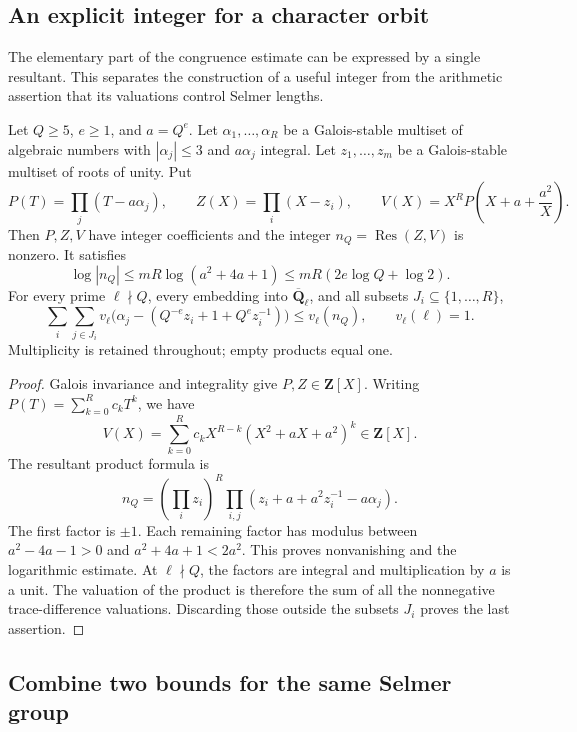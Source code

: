 \subsection{An explicit integer for a character orbit}
\label{selmer-resultant}

The elementary part of the congruence estimate can be expressed by a
single resultant. This separates the construction of a useful integer
from the arithmetic assertion that its valuations control Selmer lengths.

\begin{proposition}
\label{selmer-resultant-certificate}
Let \(Q\ge5\), \(e\ge1\), and \(a=Q^e\). Let
\(\alpha_1,\ldots,\alpha_R\) be a Galois-stable multiset of
algebraic numbers with \(|\alpha_j|\le3\) and \(a\alpha_j\)
integral. Let \(z_1,\ldots,z_m\) be a Galois-stable multiset of
roots of unity. Put
\[
 P(T)=\prod_j(T-a\alpha_j),\qquad Z(X)=\prod_i(X-z_i),
 \qquad V(X)=X^R P\!\left(X+a+\frac{a^2}{X}\right).
\]
Then \(P,Z,V\) have integer coefficients and the integer
\(n_Q=\operatorname{Res}(Z,V)\) is nonzero. It satisfies
\[
 \log|n_Q|\le mR\log(a^2+4a+1)
                 \le mR(2e\log Q+\log2).
\]
For every prime \(\ell\nmid Q\), every embedding into
\(\overline{\mathbf Q}_\ell\), and all subsets
\(J_i\subseteq\{1,\ldots,R\}\),
\[
 \sum_i\sum_{j\in J_i}
 v_\ell\bigl(\alpha_j-(Q^{-e}z_i+1+Q^e z_i^{-1})\bigr)
                                      \le v_\ell(n_Q),
 \qquad v_\ell(\ell)=1.
\]
Multiplicity is retained throughout; empty products equal one.
\end{proposition}

\begin{proof}
Galois invariance and integrality give \(P,Z\in\mathbf Z[X]\).
Writing \(P(T)=\sum_{k=0}^R c_kT^k\), we have
\[
 V(X)=\sum_{k=0}^R c_kX^{R-k}(X^2+aX+a^2)^k\in\mathbf Z[X].
\]
The resultant product formula is
\[
 n_Q=\left(\prod_i z_i\right)^R
             \prod_{i,j}(z_i+a+a^2z_i^{-1}-a\alpha_j).
\]
The first factor is \(\pm1\). Each remaining factor has modulus
between \(a^2-4a-1>0\) and \(a^2+4a+1<2a^2\).
This proves nonvanishing and the logarithmic estimate. At
\(\ell\nmid Q\), the factors are integral and multiplication by
\(a\) is a unit. The valuation of the product is therefore the sum
of all the nonnegative trace-difference valuations. Discarding those
outside the subsets \(J_i\) proves the last assertion.
\end{proof}

\subsection{Combine two bounds for the same Selmer group}
\label{selmer-common-divisor}

